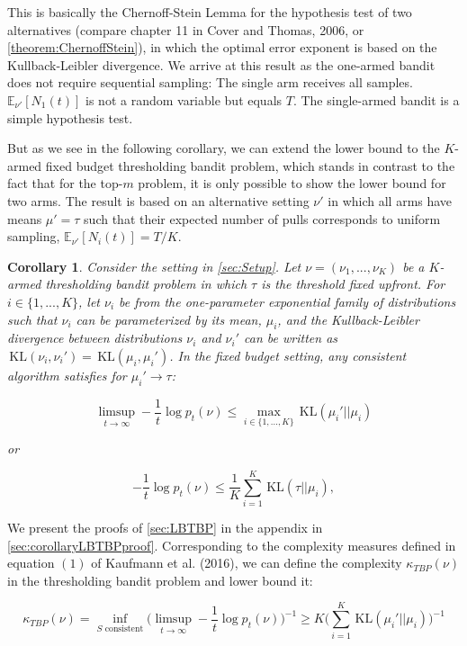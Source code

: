 \documentclass[11pt,]{article}
\newtheorem{corollary}{Corollary}
\newcommand{\KL}{\,\text{KL}}
\begin{document}
\label{corollary:LB1TBP}

This is basically the Chernoff-Stein Lemma for the hypothesis test of
two alternatives (compare chapter 11 in Cover and Thomas, 2006, or
\autoref{theorem:ChernoffStein}), in which the optimal error exponent is
based on the Kullback-Leibler divergence. We arrive at this result as
the one-armed bandit does not require sequential sampling: The single
arm receives all samples. \(\mathbb{E}_{\nu'}[N_1(t)]\) is not a random
variable but equals \(T\). The single-armed bandit is a simple
hypothesis test.

But as we see in the following corollary, we can extend the lower bound
to the \(K\)-armed fixed budget thresholding bandit problem, which
stands in contrast to the fact that for the top-\(m\) problem, it is
only possible to show the lower bound for two arms. The result is based
on an alternative setting \(\nu'\) in which all arms have means
\(\mu' = \tau\) such that their expected number of pulls corresponds to
uniform sampling, \(\mathbb{E}_{\nu'}[N_i(t)] = T/K\).

\begin{corollary}
Consider the setting in \autoref{sec:Setup}. Let $\nu = (\nu_1, ..., \nu_K)$ be a $K$-armed thresholding bandit problem in which $\tau$ is the threshold fixed upfront. For $i \in \{1,...,K\}$, let $\nu_i$ be from the one-parameter exponential family of distributions such that $\nu_i$ can be parameterized by its mean, $\mu_i$, and the Kullback-Leibler divergence between distributions $\nu_i$ and $\nu_i'$ can be written as $\KL(\nu_i, \nu_i') = \KL(\mu_i, \mu_i')$. In the fixed budget setting, any consistent algorithm satisfies for $\mu_i' \rightarrow \tau$:

$$
\limsup_{t \rightarrow \infty} -\frac{1}{t} \log p_t(\nu) \leq \max_{i \in \{1,...,K\}} \KL(\mu_i' || \mu_i)
$$

or

$$
- \frac{1}{t} \log p_t(\nu) \leq \frac{1}{K}\sum_{i=1}^{K} \KL(\tau || \mu_i),
$$
\end{corollary}

\label{corollary:LBKTBP}

We present the proofs of \autoref{sec:LBTBP} in the appendix in
\autoref{sec:corollaryLBTBPproof}. Corresponding to the complexity
measures defined in equation \((1)\) of Kaufmann et al. (2016), we can
define the complexity \(\kappa_{TBP}(\nu)\) in the thresholding bandit
problem and lower bound it:

\[
\kappa_{TBP}(\nu) = \inf_{S \text{ consistent}} \Big(\limsup_{t \rightarrow \infty} - \frac{1}{t} \log p_t(\nu)\Big)^{-1} \geq K \Big(\sum_{i=1}^{K} \KL(\mu_i'||\mu_i)\Big)^{-1}
\]
\end{document}
